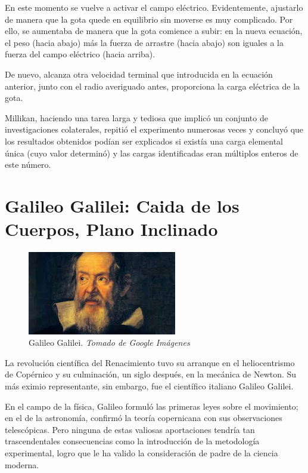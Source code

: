 \documentclass[journal]{IEEEtran}
\begin{document}
En este momento se vuelve a activar el campo eléctrico. Evidentemente, ajustarlo de manera que la gota quede en equilibrio sin moverse es muy complicado. Por ello, se aumentaba de manera que la gota comience a subir: en la nueva ecuación, el peso (hacia abajo) más la fuerza de arrastre (hacia abajo) son iguales a la fuerza del campo eléctrico (hacia arriba).

De nuevo, alcanza otra velocidad terminal que introducida en la ecuación anterior, junto con el radio averiguado antes, proporciona la carga eléctrica de la gota.

Millikan, haciendo una tarea larga y tediosa que implicó un conjunto de investigaciones colaterales, repitió el experimento numerosas veces y concluyó que los resultados obtenidos podían ser explicados si existía una carga elemental única (cuyo valor determinó) y las cargas identificadas eran múltiplos enteros de este número.






\section{Galileo Galilei: Caida de los Cuerpos, Plano Inclinado}

\begin{center}
  \begin{figure}[h!]
  \includegraphics[width=65mm]{galileo.jpg}
  \caption{Galileo Galilei. \emph{Tomado de Google Imágenes}}
  \end{figure}
\end{center}

La revolución científica del Renacimiento tuvo su arranque en el heliocentrismo de Copérnico y su culminación, un siglo después, en la mecánica de Newton. Su más eximio representante, sin embargo, fue el científico italiano Galileo Galilei. 

En el campo de la física, Galileo formuló las primeras leyes sobre el movimiento; en el de la astronomía, confirmó la teoría copernicana con sus observaciones telescópicas. Pero ninguna de estas valiosas aportaciones tendría tan trascendentales consecuencias como la introducción de la metodología experimental, logro que le ha valido la consideración de padre de la ciencia moderna.
\end{document}
